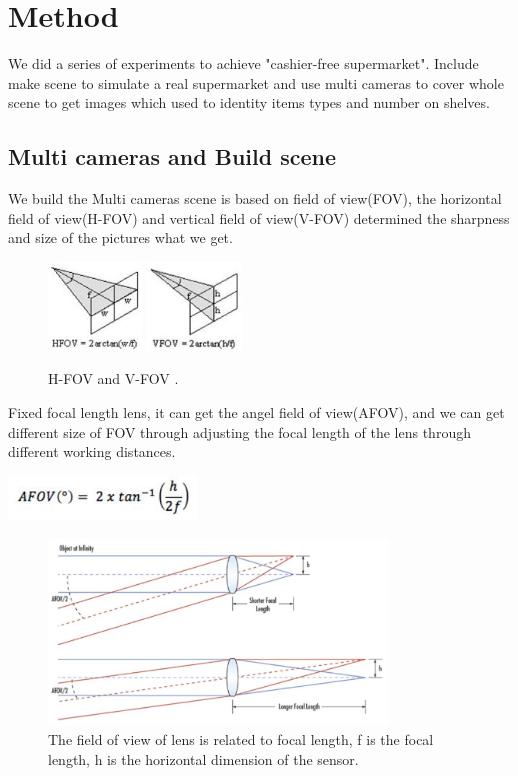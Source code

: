 \section{Method}

We did a series of experiments to achieve "cashier-free supermarket".
Include make scene to simulate a real supermarket and use multi cameras to cover whole scene to get  images which used to identity items types and number on shelves.

\subsection{Multi cameras and Build scene}
We build the Multi cameras scene is based on field of view(FOV), the horizontal field of view(H-FOV) and vertical field of view(V-FOV)\cite{Ball88} determined the sharpness and size of the pictures what we get.

\begin{figure}[htbp]
\centerline{\includegraphics[width=2.5cm,scale=0.4]{HFOV.jpg} \includegraphics[width=2.5cm,scale=0.4]{VFOV.jpg}}
\caption{H-FOV and V-FOV .}
\label{fig}
\end{figure}

Fixed focal length lens, it can get the angel field of view(AFOV), and we can get different size of FOV through adjusting the focal length of the lens through different working distances.

\centerline{\includegraphics[width=5cm,scale=0.9]{AFOV-MA.jpg}}
\begin{figure}[htbp]
\centerline{\includegraphics[width=9cm,scale=0.9]{AFOV.jpg}}
\caption{The field of view of lens is related to focal length, f is the focal length, h is the horizontal dimension of the sensor.}
\label{fig}
\end{figure}

